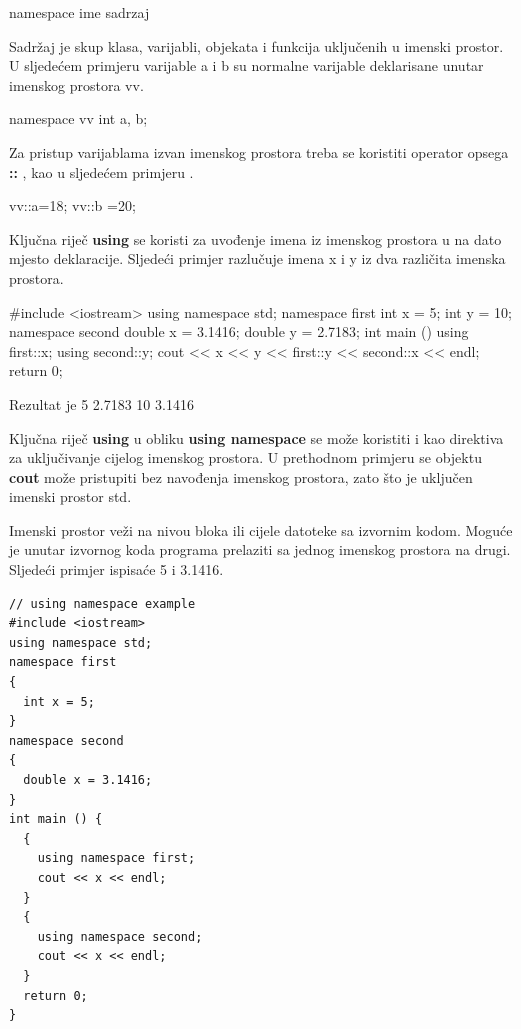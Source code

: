 \documentclass[11pt]{book}
\begin{document}
\begin{shortlisting}
  namespace ime
    {
      sadrzaj
    }
\end{shortlisting}
Sadržaj je skup klasa, varijabli, objekata i funkcija uključenih u imenski prostor. U sljedećem primjeru varijable a i b su normalne varijable deklarisane unutar imenskog prostora vv.
\begin{shortlisting}
  namespace vv
    {
      int a, b;
    }
\end{shortlisting}

Za pristup varijablama izvan imenskog prostora treba se koristiti operator opsega \textbf{::} , kao u sljedećem primjeru .

\begin{shortlisting}
  vv::a=18;
  vv::b =20;
\end{shortlisting}

Ključna riječ \textbf{using} se koristi za uvođenje imena iz imenskog prostora u na dato mjesto deklaracije. Sljedeći primjer razlučuje imena x i y iz dva različita imenska prostora.

\begin{shortlisting}
  #include <iostream>
  using namespace std;
  namespace first
    {
      int x = 5;
      int y = 10;
    }
  namespace second
    {
      double x = 3.1416;
      double y = 2.7183;
    }
  int main () {
      using first::x;
      using second::y;
      cout << x << y << first::y << second::x << endl;
      return 0;
    }
\end{shortlisting}

Rezultat je 5 2.7183 10 3.1416

Ključna riječ \textbf{using} u obliku \textbf{using namespace} se može koristiti i kao direktiva za uključivanje cijelog imenskog prostora. U prethodnom primjeru se objektu \textbf{cout} može pristupiti bez navođenja imenskog prostora, zato što je uključen imenski prostor std.

Imenski prostor veži na nivou bloka ili cijele datoteke sa izvornim kodom. Moguće je unutar izvornog koda programa prelaziti sa jednog imenskog prostora na drugi. Sljedeći primjer ispisaće 5 i 3.1416.

\begin{lstlisting}
// using namespace example
#include <iostream>
using namespace std;
namespace first
{
  int x = 5;
}
namespace second
{
  double x = 3.1416;
}
int main () {
  {
    using namespace first;
    cout << x << endl;
  }
  {
    using namespace second;
    cout << x << endl;
  }
  return 0;
}
\end{lstlisting}
\end{document}
